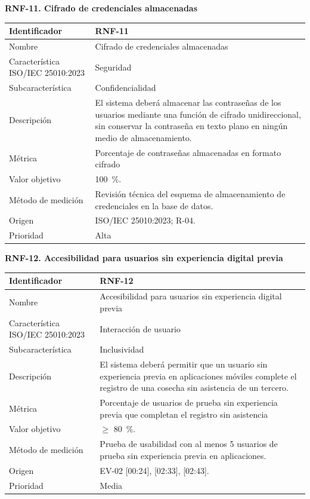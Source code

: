 \documentclass[12pt,a4paper]{article}
\begin{document}
\bigskip
\noindent\textbf{RNF-11. Cifrado de credenciales almacenadas}
\label{tab:RNF-11}

\begin{center}
\begin{longtable}{|p{4.2cm}|p{10cm}|}
\hline
Identificador & RNF-11 \\
\hline
Nombre & Cifrado de credenciales almacenadas \\
\hline
Característica ISO/IEC 25010:2023 & Seguridad \\
\hline
Subcaracterística & Confidencialidad \\
\hline
Descripción & El sistema deberá almacenar las contraseñas de los usuarios mediante una función de cifrado unidireccional, sin conservar la contraseña en texto plano en ningún medio de almacenamiento. \\
\hline
Métrica & Porcentaje de contraseñas almacenadas en formato cifrado \\
\hline
Valor objetivo & 100~\%. \\
\hline
Método de medición & Revisión técnica del esquema de almacenamiento de credenciales en la base de datos. \\
\hline
Origen & ISO/IEC 25010:2023; R-04. \\
\hline
Prioridad & Alta \\
\hline
\end{longtable}
\end{center}

\bigskip
\noindent\textbf{RNF-12. Accesibilidad para usuarios sin experiencia digital previa}
\label{tab:RNF-12}

\begin{center}
\begin{longtable}{|p{4.2cm}|p{10cm}|}
\hline
Identificador & RNF-12 \\
\hline
Nombre & Accesibilidad para usuarios sin experiencia digital previa \\
\hline
Característica ISO/IEC 25010:2023 & Interacción de usuario \\
\hline
Subcaracterística & Inclusividad \\
\hline
Descripción & El sistema deberá permitir que un usuario sin experiencia previa en aplicaciones móviles complete el registro de una cosecha sin asistencia de un tercero. \\
\hline
Métrica & Porcentaje de usuarios de prueba sin experiencia previa que completan el registro sin asistencia \\
\hline
Valor objetivo & $\geq$ 80~\%. \\
\hline
Método de medición & Prueba de usabilidad con al menos 5 usuarios de prueba sin experiencia previa en aplicaciones. \\
\hline
Origen & EV-02 [00:24], [02:33], [02:43]. \\
\hline
Prioridad & Media \\
\hline
\end{longtable}
\end{center}
\end{document}

